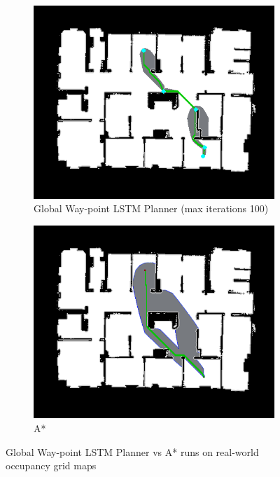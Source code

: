 \begin{figure}[]
\begin{subfigure}[b]{0.40\linewidth}
    \includegraphics[width=\linewidth]{images/screenshot_150.png}
     \caption{Global Way-point LSTM Planner (max iterations 100)}
  \end{subfigure}
  \hfill
  \begin{subfigure}[b]{0.40\linewidth}
    \includegraphics[width=\linewidth]{images/screenshot_127.png}
     \caption{A*\newline}
  \end{subfigure}
  \caption{Global Way-point LSTM Planner vs A* runs on real-world occupancy grid maps \cite{third_map}}
  \label{fig: wp_vs_a_3}
\end{figure}

